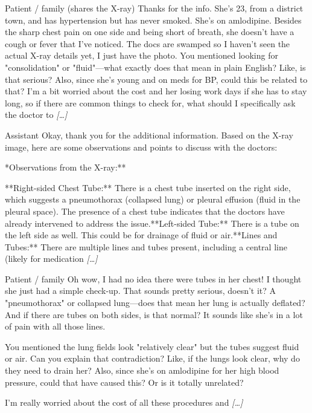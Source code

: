 \begin{patientmsg}{Patient / family (shares the X-ray)}
Thanks for the info. She's 23, from a district town, and has hypertension but has never smoked. She's on amlodipine. Besides the sharp chest pain on one side and being short of breath, she doesn't have a cough or fever that I've noticed. The docs are swamped so I haven't seen the actual X-ray details yet, I just have the photo. You mentioned looking for "consolidation" or "fluid"---what exactly does that mean in plain English? Like, is that serious? Also, since she's young and on meds for BP, could this be related to that? I'm a bit worried about the cost and her losing work days if she has to stay long, so if there are common things to check for, what should I specifically ask the doctor to  \textit{[\ldots]}
\end{patientmsg}

\begin{assistantmsg}{Assistant}
Okay, thank you for the additional information. Based on the X-ray image, here are some observations and points to discuss with the doctors:\par **Observations from the X-ray:**\par *   **Right-sided Chest Tube:** There is a chest tube inserted on the right side, which suggests a pneumothorax (collapsed lung) or pleural effusion (fluid in the pleural space). The presence of a chest tube indicates that the doctors have already intervened to address the issue.\newline *   **Left-sided Tube:** There is a tube on the left side as well. This could be for drainage of fluid or air.\newline *   **Lines and Tubes:** There are multiple lines and tubes present, including a central line (likely for medication  \textit{[\ldots]}
\end{assistantmsg}

\begin{patientmsg}{Patient / family}
Oh wow, I had no idea there were tubes in her chest! I thought she just had a simple check-up. That sounds pretty serious, doesn't it? A "pneumothorax" or collapsed lung---does that mean her lung is actually deflated? And if there are tubes on both sides, is that normal? It sounds like she's in a lot of pain with all those lines.\par You mentioned the lung fields look "relatively clear" but the tubes suggest fluid or air. Can you explain that contradiction? Like, if the lungs look clear, why do they need to drain her? Also, since she's on amlodipine for her high blood pressure, could that have caused this? Or is it totally unrelated?\par I'm really worried about the cost of all these procedures and  \textit{[\ldots]}
\end{patientmsg}

